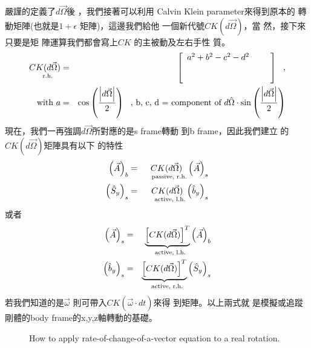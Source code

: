 \documentclass[12pt,a4paper]{article}
\begin{document}
嚴謹的定義了$d\vec{\Omega}$後%
，我們接著可以利用%
Calvin Klein parameter來得到原本的%
轉動矩陣(也就是$1+\epsilon $%
矩陣)，這邊我們給他%
一個新代號$CK(d\vec{\Omega})$，當%
然，接下來只要是矩%
陣運算我們都會寫上$CK$%
的主被動及左右手性%
質。%
\begin{eqnarray*}
\underset{\text{r.h.}}{CK(d\vec{\Omega})} &=&\left[ 
\begin{array}{ccc}
a^{2}+b^{2}-c^{2}-d^{2} &  &  \\ 
&  &  \\ 
&  & 
\end{array}%
\right] \text{,} \\
\text{with }a &=&\cos \left( \frac{\left\vert d\vec{\Omega}\right\vert }{2}%
\right) \text{, b, c, d = component of }d\hat{\Omega}\cdot \sin \left( \frac{%
\left\vert d\vec{\Omega}\right\vert }{2}\right)
\end{eqnarray*}%
現在，我們一再強調$d%
\vec{\Omega}$所對應的是s frame轉動%
到b frame，因此我們建立%
的$CK(d\vec{\Omega})$矩陣具有以下%
的特性%
\begin{eqnarray*}
\left( \vec{A}\right) _{b} &=&\underset{\text{passive, r.h.}}{CK(d\vec{\Omega%
})}\left( \vec{A}\right) _{s} \\
\left( \hat{S}_{y}\right) _{s} &=&\underset{\text{active, l.h.}}{CK(d\vec{%
\Omega})}\left( \hat{b}_{y}\right) _{s}
\end{eqnarray*}%
或者%
\begin{eqnarray}
\left( \vec{A}\right) _{s} &=&\underset{\text{active, l.h.}}{\underbrace{%
\left[ CK(d\vec{\Omega})\right] ^{T}}}\left( \vec{A}\right) _{b}
\label{frametrans} \\
\left( \hat{b}_{y}\right) _{s} &=&\underset{\text{active, r.h.}}{\underbrace{%
\left[ CK(d\vec{\Omega})\right] ^{T}}}\left( \hat{S}_{y}\right) _{s}
\label{vecrot}
\end{eqnarray}%
若我們知道的是$\vec{\omega}$%
則可帶入$CK(\vec{\omega}\cdot dt)$來得%
到矩陣。以上兩式就%
是模擬或追蹤剛體的body
frame的x,y,z軸轉動的基礎。

\begin{figure}[th]
\caption{How to apply rate-of-change-of-a-vector equation to a real rotation.
}
\begin{center}
\end{center}
\label{szsbtdtfig}
\end{figure}
\end{document}
